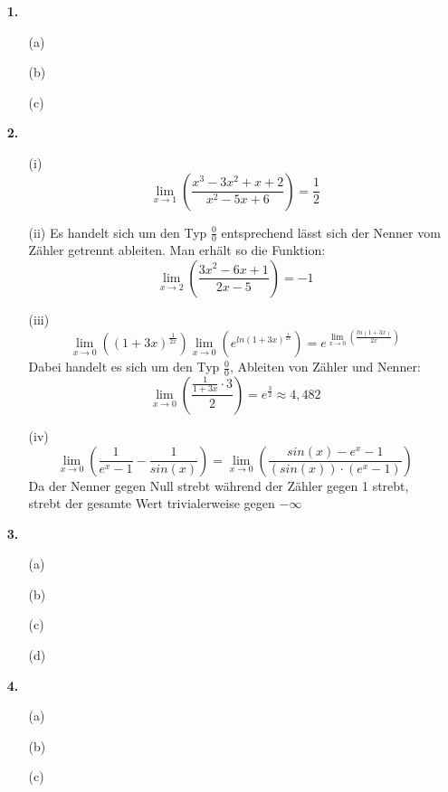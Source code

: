 \documentclass[a4paper,11pt,fleqn]{scrartcl}
\author{\authorinfo}
\title{\titleinfo}
\date{\today}
\newcommand{\bra}[1]{\left(#1\right)}
\newcommand{\limxx}[2]{\lim\limits_{x \rightarrow #1}\bra{#2}}
\begin{document}
\maketitle
\begin{enumerate}
    \item[\textbf{1.}]
        \begin{enumerate}
            \item[(a)]
            \item[(b)]
            \item[(c)]
        \end{enumerate}
    \item[\textbf{2.}]
        \begin{enumerate}
            \item[(i)]
                \[ \limxx{1}{\frac{x^3 - 3x^2 + x + 2}{x^2 - 5x + 6}} = \frac{1}{2}\]
            \item[(ii)]
                Es handelt sich um den Typ $\frac{0}{0}$ entsprechend lässt sich der Nenner vom Zähler getrennt ableiten.
                Man erhält so die Funktion: \[ \limxx{2}{\frac{3x^2 - 6x + 1}{2x - 5}} = -1\]
            \item[(iii)]
                \[ \limxx{0}{(1+3x)^\frac{1}{2x}} \limxx{0}{e^{ln(1+3x)^\frac{1}{2x}}} = e^{\limxx{0}{\frac{ln(1+3x)}{2x}}} \]
                Dabei handelt es sich um den Typ $\frac{0}{0}$, Ableiten von Zähler und Nenner:
                \[ \limxx{0}{\frac{ \frac{1}{1+3x} \cdot 3 }{2}} = e^{\frac{3}{2}} \approx 4,482 \]
            \item[(iv)]
                \[ \limxx{0}{ \frac{1}{e^x - 1} - \frac{1}{sin(x)}} = \limxx{0}{\frac{sin(x) - e^x - 1}{(sin(x)) \cdot (e^x-1)}} \]
                Da der Nenner gegen Null strebt während der Zähler gegen 1 strebt, strebt der gesamte Wert trivialerweise gegen $- \infty$
        \end{enumerate}
    \item[\textbf{3.}]
        \begin{enumerate}
            \item[(a)]
            \item[(b)]
            \item[(c)]
            \item[(d)]
        \end{enumerate}
    \item[\textbf{4.}]
        \begin{enumerate}
            \item[(a)]
            \item[(b)]
            \item[(c)]
        \end{enumerate}
\end{enumerate}
\end{document}
